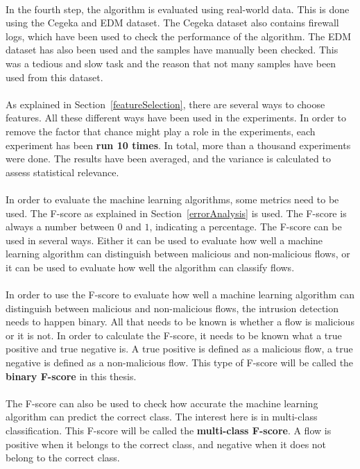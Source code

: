 \\
In the fourth step, the algorithm is evaluated using real-world data. This is done using the Cegeka and EDM dataset. The Cegeka dataset also contains firewall logs, which have been used to check the performance of the algorithm. The EDM dataset has also been used and the samples have manually been checked. This was a tedious and slow task and the reason that not many samples have been used from this dataset.\\
\\
As explained in Section~\ref{featureSelection}, there are several ways to choose features. All these different ways have been used in the experiments. In order to remove the factor that chance might play a role in the experiments, each experiment has been \textbf{run 10 times}. In total, more than a thousand experiments were done. The results have been averaged, and the variance is calculated to assess statistical relevance.\\
\\
In order to evaluate the machine learning algorithms, some metrics need to be used. The F-score as explained in Section~\ref{errorAnalysis} is used. The F-score is always a number between $0$ and $1$, indicating a percentage. The F-score can be used in several ways. Either it can be used to evaluate how well a machine learning algorithm can distinguish between malicious and non-malicious flows, or it can be used to evaluate how well the algorithm can classify flows.\\
\\
In order to use the F-score to evaluate how well a machine learning algorithm can distinguish between malicious and non-malicious flows, the intrusion detection needs to happen binary. All that needs to be known is whether a flow is malicious or it is not. In order to calculate the F-score, it needs to be known what a true positive and true negative is. A true positive is defined as a malicious flow, a true negative is defined as a non-malicious flow. This type of F-score will be called the \textbf{binary F-score} in this thesis.\\
\\
The F-score can also be used to check how accurate the machine learning algorithm can predict the correct class. The interest here is in multi-class classification. This F-score will be called the \textbf{multi-class F-score}. A flow is positive when it belongs to the correct class, and negative when it does not belong to the correct class.\\
